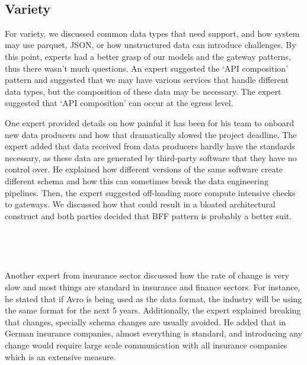 \documentclass{bmcart}
\begin{document}
\,

\setlength{\fboxsep}{0.7em}
\noindent{}


\subsection{Variety}

For variety, we discussed common data types that need support, and how system may use parquet, JSON, or how unstructured data can introduce challenges. By this point, experts had a better grasp of our models and the gateway patterns, thus there wasn't much questions. An expert suggested the `API composition' pattern and suggested that we may have various services that handle different data types, but the composition of these data may be necessary. The expert suggested that `API composition' can occur at the egress level. 

One expert provided details on how painful it has been for his team to onboard new data producers and how that dramatically slowed the project deadline. The expert added that data received from data producers hardly have the standards necessary, as these data are generated by third-party software that they have no control over. He explained how different versions of the same software create different schema and how this can sometimes break the data engineering pipelines. Then, the expert suggested off-loading more compute intensive checks to gateways. We discussed how that could result in a bloated architectural construct and both parties decided that BFF pattern is probably a better suit.  

\,

\setlength{\fboxsep}{0.7em}
\noindent{}

\,

Another expert from insurance sector discussed how the rate of change is very slow and most things are standard in insurance and finance sectors. For instance, he stated that if Avro is being used as the data format, the industry will be using the same format for the next 5 years. Additionally, the expert explained breaking that changes, specially schema changes are usually avoided. He added that in German insurance companies, almost everything is standard, and introducing any change would require large scale communication with all insurance companies which is an extensive measure. 
\end{document}
